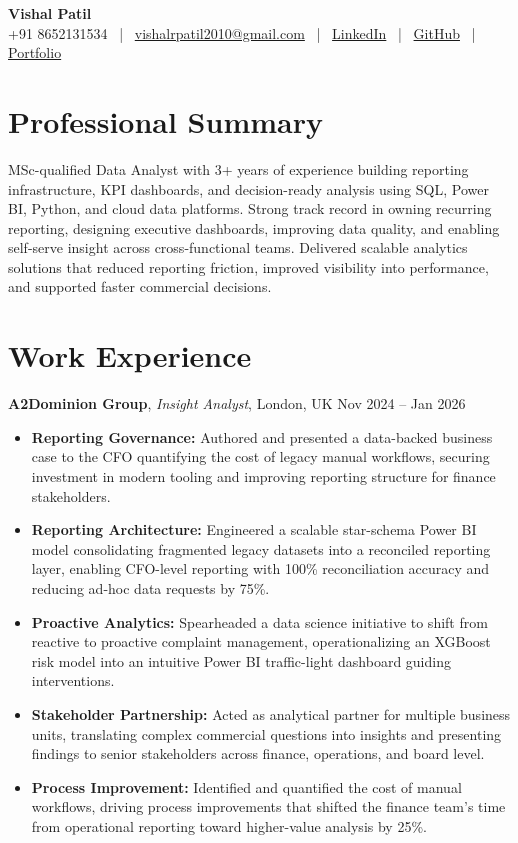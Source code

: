 \documentclass[10pt, a4paper]{article}
\begin{document}
\begin{center}
    {\LARGE \textbf{Vishal Patil}} \\[2pt]
    +91 8652131534 \, | \, \href{mailto:vishalrpatil2010@gmail.com}{vishalrpatil2010@gmail.com} \, | \, \href{https://www.linkedin.com/in/vishalrpatill/}{LinkedIn} \, | \, \href{https://github.com/VishalP44}{GitHub} \, | \, \href{https://vishalp44.github.io/Vishal\_Patil\_Portfolio/\#contact}{Portfolio}
\end{center}

\section*{Professional Summary}
MSc-qualified Data Analyst with 3+ years of experience building reporting infrastructure, KPI dashboards, and decision-ready analysis using SQL, Power BI, Python, and cloud data platforms. Strong track record in owning recurring reporting, designing executive dashboards, improving data quality, and enabling self-serve insight across cross-functional teams. Delivered scalable analytics solutions that reduced reporting friction, improved visibility into performance, and supported faster commercial decisions.

\section*{Work Experience}

\textbf{A2Dominion Group}, \textit{Insight Analyst}, London, UK \hfill Nov 2024 -- Jan 2026
\begin{itemize}
    \item \textbf{Reporting Governance:} Authored and presented a data-backed business case to the CFO quantifying the cost of legacy manual workflows, securing investment in modern tooling and improving reporting structure for finance stakeholders.
    \item \textbf{Reporting Architecture:} Engineered a scalable star-schema Power BI model consolidating fragmented legacy datasets into a reconciled reporting layer, enabling CFO-level reporting with 100\% reconciliation accuracy and reducing ad-hoc data requests by 75\%.
    \item \textbf{Proactive Analytics:} Spearheaded a data science initiative to shift from reactive to proactive complaint management, operationalizing an XGBoost risk model into an intuitive Power BI traffic-light dashboard guiding interventions.
    \item \textbf{Stakeholder Partnership:} Acted as analytical partner for multiple business units, translating complex commercial questions into insights and presenting findings to senior stakeholders across finance, operations, and board level.
    \item \textbf{Process Improvement:} Identified and quantified the cost of manual workflows, driving process improvements that shifted the finance team's time from operational reporting toward higher-value analysis by 25\%.
\end{itemize}
\end{document}
